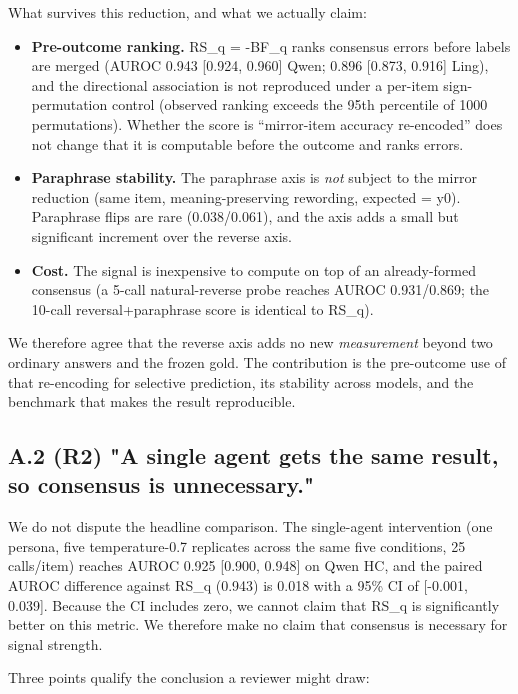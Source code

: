 \documentclass[11pt]{article}
\begin{document}
What survives this reduction, and what we actually claim:

\begin{itemize}
  \item \textbf{Pre-outcome ranking.} RS\_q = -BF\_q ranks consensus errors before labels are merged (AUROC 0.943 [0.924, 0.960] Qwen; 0.896 [0.873, 0.916] Ling), and the directional association is not reproduced under a per-item sign-permutation control (observed ranking exceeds the 95th percentile of 1000 permutations). Whether the score is “mirror-item accuracy re-encoded” does not change that it is computable before the outcome and ranks errors.
  \item \textbf{Paraphrase stability.} The paraphrase axis is \emph{not} subject to the mirror reduction (same item, meaning-preserving rewording, expected = y0). Paraphrase flips are rare (0.038/0.061), and the axis adds a small but significant increment over the reverse axis.
  \item \textbf{Cost.} The signal is inexpensive to compute on top of an already-formed consensus (a 5-call natural-reverse probe reaches AUROC 0.931/0.869; the 10-call reversal+paraphrase score is identical to RS\_q).
\end{itemize}

We therefore agree that the reverse axis adds no new \emph{measurement} beyond two ordinary answers and the frozen gold. The contribution is the pre-outcome use of that re-encoding for selective prediction, its stability across models, and the benchmark that makes the result reproducible.

\subsection{A.2 (R2) "A single agent gets the same result, so consensus is unnecessary."}

We do not dispute the headline comparison. The single-agent intervention (one persona, five temperature-0.7 replicates across the same five conditions, 25 calls/item) reaches AUROC 0.925 [0.900, 0.948] on Qwen HC, and the paired AUROC difference against RS\_q (0.943) is 0.018 with a 95\% CI of [-0.001, 0.039]. Because the CI includes zero, we cannot claim that RS\_q is significantly better on this metric. We therefore make no claim that consensus is necessary for signal strength.

Three points qualify the conclusion a reviewer might draw:
\end{document}
